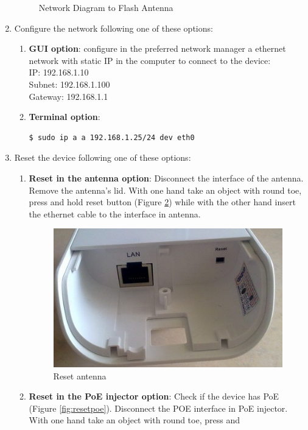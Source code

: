 \documentclass[11pt]{article}
\begin{document}
\begin{enumerate}
\begin{figure}[htb]
\caption{\label{fig:flashdiagram}Network Diagram to Flash Antenna}
\end{figure}
\item Configure the network following one of these options:
\begin{enumerate}
\item \textbf{GUI option}: configure in the preferred network manager a
ethernet network with static IP in the computer to connect to
the device: \\
      IP: 192.168.1.10 \\
      Subnet: 192.168.1.100 \\
      Gateway: 192.168.1.1
\item \textbf{Terminal option}: 
\begin{verbatim}
$ sudo ip a a 192.168.1.25/24 dev eth0
\end{verbatim}
\end{enumerate}
\item Reset the device following one of these options:
\begin{enumerate}
\item \textbf{Reset in the antenna option}: Disconnect the interface of the
antenna. Remove the antenna's lid. With one hand take an object
with round toe, press and hold reset button (Figure
\ref{fig:resetant}) while with the other hand insert the ethernet
cable to the interface in antenna.
\begin{figure}[htb]
\centering
\includegraphics[width=.9\linewidth]{./img/general/reset-antenna.jpg}
\caption{\label{fig:resetant}Reset antenna}
\end{figure}
\item \textbf{Reset in the PoE injector option}: Check if the device has
PoE (Figure \ref{fig:resetpoe}). Disconnect the POE interface in PoE
injector. With one hand take an object with round toe, press and

\end{enumerate}
\end{enumerate}
\end{document}
